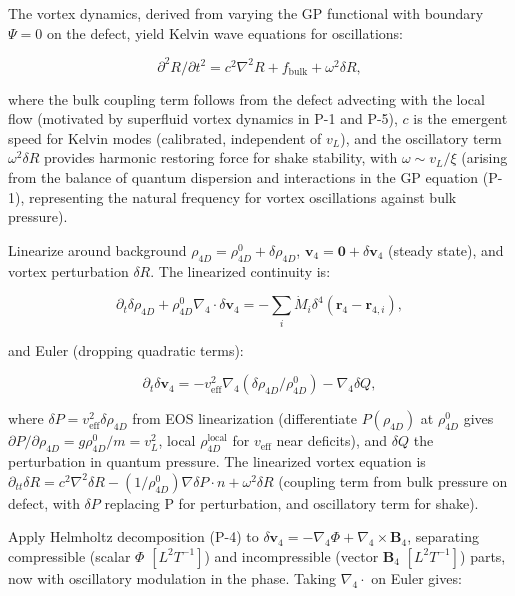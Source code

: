 The vortex dynamics, derived from varying the GP functional with boundary $\Psi=0$ on the defect, yield Kelvin wave equations for oscillations:

\begin{equation}
\partial^2 R / \partial t^2 = c^2 \nabla^2 R + f_{\text{bulk}} + \omega^2 \delta R,
\end{equation}

where the bulk coupling term follows from the defect advecting with the local flow (motivated by superfluid vortex dynamics in P-1 and P-5), $c$ is the emergent speed for Kelvin modes (calibrated, independent of $v_L$), and the oscillatory term $\omega^2 \delta R$ provides harmonic restoring force for shake stability, with $\omega \sim v_L / \xi$ (arising from the balance of quantum dispersion and interactions in the GP equation (P-1), representing the natural frequency for vortex oscillations against bulk pressure).

Linearize around background $\rho_{4D} = \rho_{4D}^0 + \delta \rho_{4D}$, $\mathbf{v}_4 = \mathbf{0} + \delta \mathbf{v}_4$ (steady state), and vortex perturbation $\delta R$. The linearized continuity is:

\begin{equation}
\partial_t \delta \rho_{4D} + \rho_{4D}^0 \nabla_4 \cdot \delta \mathbf{v}_4 = -\sum_i \dot{M}_i \delta^4(\mathbf{r}_4 - \mathbf{r}_{4,i}),
\end{equation}

and Euler (dropping quadratic terms):

\begin{equation}
\partial_t \delta \mathbf{v}_4 = -v_{\text{eff}}^2 \nabla_4 (\delta \rho_{4D} / \rho_{4D}^0) - \nabla_4 \delta Q,
\end{equation}

where $\delta P = v_{\text{eff}}^2 \delta \rho_{4D}$ from EOS linearization (differentiate $P(\rho_{4D})$ at $\rho_{4D}^0$ gives $\partial P / \partial \rho_{4D} = g \rho_{4D}^0 / m = v_L^2$, local $\rho_{4D}^{\text{local}}$ for $v_{\text{eff}}$ near deficits), and $\delta Q$ the perturbation in quantum pressure. The linearized vortex equation is $\partial_{tt} \delta R = c^2 \nabla^2 \delta R - (1 / \rho_{4D}^0) \nabla \delta P \cdot n + \omega^2 \delta R$ (coupling term from bulk pressure on defect, with $\delta P$ replacing P for perturbation, and oscillatory term for shake).

Apply Helmholtz decomposition (P-4) to $\delta \mathbf{v}_4 = -\nabla_4 \Phi + \nabla_4 \times \mathbf{B}_4$, separating compressible (scalar $\Phi$ $[L^2 T^{-1}]$) and incompressible (vector $\mathbf{B}_4$ $[L^2 T^{-1}]$) parts, now with oscillatory modulation in the phase. Taking $\nabla_4 \cdot$ on Euler gives:


